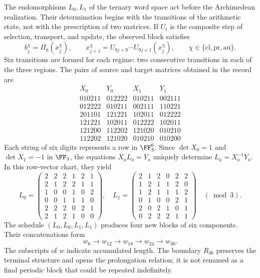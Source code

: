 The endomorphisms \(L_0,L_1\) of the ternary word space act before the Archimedean realization. Their determination begins with the transitions of the arithmetic state, not with the prescription of two matrices. If \(U_t\) is the composite step of selection, transport, and update, the observed block satisfies
\[
 b_j^\chi=\Pi_6(x_j^\chi),\qquad
 x_{j+1}^\chi=U_{9j+9}\cdots U_{9j+1}(x_j^\chi),
 \qquad \chi\in\{\mathrm{cl},\mathrm{pr},\mathrm{au}\}.
\]
Six transitions are formed for each regime: two consecutive transitions in each of the three regions. The pairs of source and target matrices obtained in the record are
\[
\begin{array}{c|c|c|c}
X_0&Y_0&X_1&Y_1\\\hline
010211&012222&010211&002111\\
012222&010211&002111&110221\\
201101&121221&102011&012222\\
121221&102011&012222&102011\\
121200&112202&121020&010210\\
112202&121020&010210&010200
\end{array}
\]
Each string of six digits represents a row in \(\FF_3^6\). Since \(\det X_0=1\) and \(\det X_1=-1\) in \(\FF_3\), the equations \(X_aL_a=Y_a\) uniquely determine \(L_a=X_a^{-1}Y_a\). In this row-vector chart, they yield
\[
 L_0=\begin{pmatrix}
 2&2&2&1&2&1\\2&1&2&2&1&1\\1&0&0&1&0&2\\
 0&0&1&1&1&0\\2&2&2&0&2&1\\2&1&2&1&0&0
 \end{pmatrix},\quad
 L_1=\begin{pmatrix}
 2&1&2&0&2&2\\1&2&1&1&2&0\\1&2&1&1&1&2\\
 0&1&0&0&2&1\\2&0&2&1&0&1\\0&2&2&2&1&1
 \end{pmatrix}\quad(\bmod3).
\]
The schedule \((L_0,L_0,L_1,L_1)\) produces four new blocks of six components. Their concatenations form
\[
 w_6\longrightarrow w_{12}\longrightarrow w_{18}
 \longrightarrow w_{24}\longrightarrow w_{30}.
\]
The subscripts of \(w\) indicate accumulated length. The boundary \(R_{36}\) preserves the terminal structure and opens the prolongation relation; it is not renamed as a final periodic block that could be repeated indefinitely.

